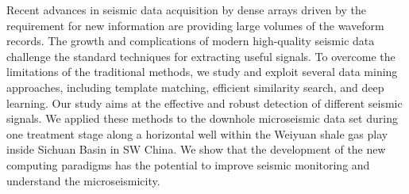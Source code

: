 Recent advances in seismic data acquisition by dense arrays driven by the requirement for new information are providing large volumes of the waveform records. 
The growth and complications of modern high-quality seismic data challenge the standard techniques for extracting useful signals. 
To overcome the limitations of the traditional methods, 
we study and exploit several data mining approaches, including template matching, efficient similarity search, and deep learning. 
Our study aims at the effective and robust detection of different seismic signals. 
We applied these methods to the downhole microseismic data set during one treatment stage along a
horizontal well within the Weiyuan shale gas play inside Sichuan Basin in SW China. 
We show that the development of the new computing paradigms has the potential to improve seismic monitoring and understand the microseismicity.   